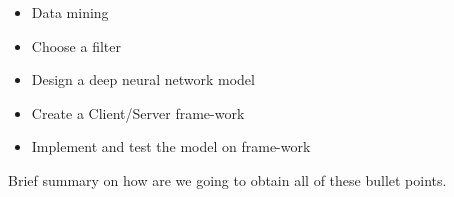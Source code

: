 \begin{itemize}
	\item Data mining
	\item Choose a filter
	\item Design a deep neural network model
	\item Create a Client/Server frame-work
	\item Implement and test the model on frame-work
\end{itemize}

Brief summary on how are we going to obtain all of these bullet points.
